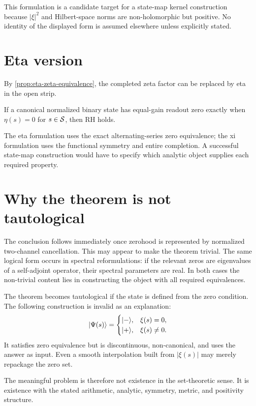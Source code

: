 This formulation is a candidate target for a state-map kernel construction because $|\xi|^2$ and Hilbert-space norms are non-holomorphic but positive. No identity of the displayed form is assumed elsewhere unless explicitly stated.

\section{Eta version}

By \cref{prop:eta-zeta-equivalence}, the completed zeta factor can be replaced by eta in the open strip.

\begin{corollary}
If a canonical normalized binary state has equal-gain readout zero exactly when $\eta(s)=0$ for $s\in\mathcal{S}$, then RH holds.
\end{corollary}

The eta formulation uses the exact alternating-series zero equivalence; the xi formulation uses the functional symmetry and entire completion. A successful state-map construction would have to specify which analytic object supplies each required property.

\section{Why the theorem is not tautological}

The conclusion follows immediately once zerohood is represented by normalized two-channel cancellation. This may appear to make the theorem trivial. The same logical form occurs in spectral reformulations: if the relevant zeros are eigenvalues of a self-adjoint operator, their spectral parameters are real. In both cases the non-trivial content lies in constructing the object with all required equivalences.

The theorem becomes tautological if the state is defined from the zero condition. The following construction is invalid as an explanation:
\[
 \lvert \Psi(s)\rangle=
 \begin{cases}
  \lvert -\rangle,&\xi(s)=0,\\
  \lvert +\rangle,&\xi(s)\neq0.
 \end{cases}
\]
It satisfies zero equivalence but is discontinuous, non-canonical, and uses the answer as input. Even a smooth interpolation built from $|\xi(s)|$ may merely repackage the zero set.

The meaningful problem is therefore not existence in the set-theoretic sense. It is existence with the stated arithmetic, analytic, symmetry, metric, and positivity structure.

